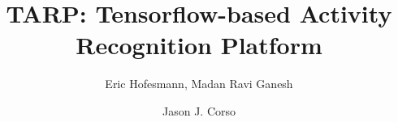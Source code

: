 \documentclass{llncs}
\begin{document}
\pagestyle{headings}
\mainmatter
\def\ECCV18SubNumber{1816}  %

\title{TARP: Tensorflow-based Activity Recognition Platform} %



\author{Eric Hofesmann, Madan Ravi Ganesh \and Jason J. Corso}
\newcommand{\acro}{TARP}
\newcommand{\model}{\textbf{Model submodule}}
\newcommand{\checkpoint}{\textbf{Checkpoint submodule}}
\newcommand{\metrics}{\textbf{Metrics submodule}}
\newcommand{\data}{\textbf{Data Input Block}}
\newcommand{\exec}{\textbf{Execution Block}}

\maketitle
\end{document}
